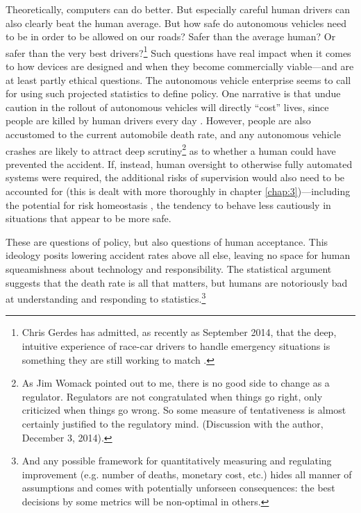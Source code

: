 Theoretically, computers can do better. But especially careful human
drivers can also clearly beat the human average. But how safe do
autonomous vehicles need to be in order to be allowed on our roads?
Safer than the average human? Or safer than the very best
drivers?\footnote{Chris Gerdes has admitted, as recently as September
  2014, that the deep, intuitive experience of race-car drivers to
  handle emergency situations is something they are still working to
  match \cite{8truthsandmyths}.}
Such questions have real impact when it comes to how devices are
designed and when they become commercially viable---and are at least
partly ethical questions. The autonomous
vehicle enterprise seems to call for using such projected statistics
to define policy. One narrative is that undue caution in the
rollout of autonomous vehicles will directly ``cost'' lives, since
people are killed by human drivers every day \cite{driverlessfuture}. However,
people are also accustomed to the current automobile death rate, and
any autonomous vehicle crashes are likely to attract deep
scrutiny\footnote{As Jim Womack pointed out to me, there is no good side
to change as a regulator. Regulators are not congratulated when things
go right, only criticized when things go wrong. So some measure of
tentativeness is almost certainly justified to the regulatory mind.
(Discussion with the author, December 3, 2014).} as
to whether a human could have prevented the accident. If,
instead, human oversight to otherwise fully automated systems were
required, the additional risks of supervision would also need to be
accounted for (this is dealt with more thoroughly in chapter
\ref{chap:3})---including the potential for risk homeostasis
\cite{Wilde}, the tendency to
behave less cautiously in situations that appear to be more safe.

These are questions of policy, but also questions of human acceptance.
This ideology posits lowering accident rates above all else, leaving
no space for human squeamishness about technology and responsibility. 
The statistical argument suggests that the death rate is all that
matters, but humans are notoriously bad at understanding and
responding to statistics.\footnote{And any possible framework for
  quantitatively measuring and regulating improvement (e.g. number of deaths,
  monetary cost, etc.) hides all manner of assumptions and comes with
  potentially unforseen consequences: the best decisions by some
  metrics will be non-optimal in others.}

